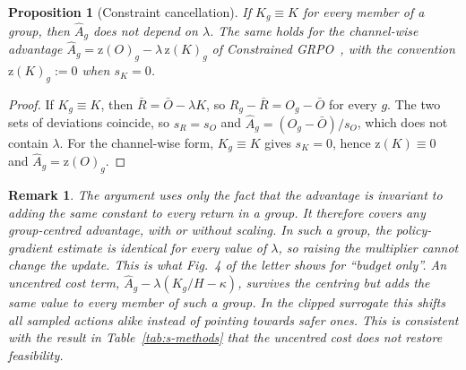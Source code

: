 \documentclass[10pt,journal,onecolumn]{IEEEtran}
\newtheorem{proposition}{Proposition}
\newtheorem{remark}{Remark}
\begin{document}
\begin{proposition}[Constraint cancellation]
If $K_g\equiv K$ for every member of a group, then $\hat A_g$ does not depend on $\lambda$. The same holds for the channel-wise advantage $\hat A_g=\mathrm{z}(O)_g-\lambda\,\mathrm{z}(K)_g$ of Constrained GRPO~\cite{girgis2026cgrpo}, with the convention $\mathrm{z}(K)_g:=0$ when $s_K=0$.
\end{proposition}
\begin{proof}
If $K_g\equiv K$, then $\bar R=\bar O-\lambda K$, so $R_g-\bar R=O_g-\bar O$ for every $g$. The two sets of deviations coincide, so $s_R=s_O$ and $\hat A_g=(O_g-\bar O)/s_O$, which does not contain $\lambda$. For the channel-wise form, $K_g\equiv K$ gives $s_K=0$, hence $\mathrm{z}(K)\equiv0$ and $\hat A_g=\mathrm{z}(O)_g$.
\end{proof}

\begin{remark}
The argument uses only the fact that the advantage is invariant to adding the same constant to every return in a group. It therefore covers any group-centred advantage, with or without scaling. In such a group, the policy-gradient estimate is identical for every value of $\lambda$, so raising the multiplier cannot change the update. This is what Fig.~4 of the letter shows for ``budget only''. An \emph{uncentred} cost term, $\hat A_g-\lambda(K_g/H-\kappa)$, survives the centring but adds the same value to every member of such a group. In the clipped surrogate this shifts all sampled actions alike instead of pointing towards safer ones. This is consistent with the result in Table~\ref{tab:s-methods} that the uncentred cost does not restore feasibility.
\end{remark}
\end{document}
